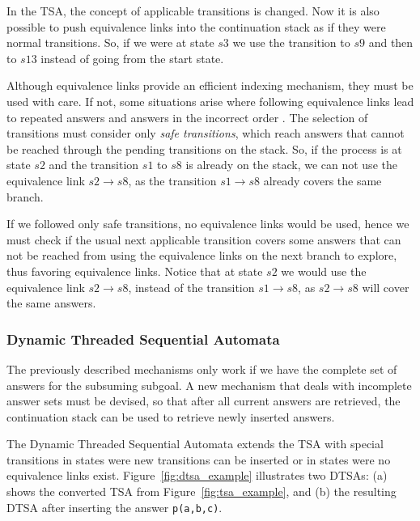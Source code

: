 In the TSA, the concept of applicable transitions is changed. Now it is also possible to push equivalence links
into the continuation stack as if they were normal transitions. So, if we were at state $s3$ we use
the transition to $s9$ and then to $s13$ instead of going from the start state.

Although equivalence links provide an efficient indexing mechanism, they must be used with care. If not,
some situations arise where following equivalence links lead to repeated answers and answers in the
incorrect order \cite{Rao-96}. The selection of transitions must consider only \textit{safe transitions},
which reach answers that cannot be reached through the pending transitions on the stack.
So, if the process is at state $s2$ and the transition $s1$ to $s8$ is already on the
stack, we can not use the equivalence link $s2 \rightarrow s8$, as the transition $s1 \rightarrow s8$
already covers the same branch.

If we followed only safe transitions, no equivalence links would be used, hence we must check if
the usual next applicable transition covers some answers that can not be reached from using the
equivalence links on the next branch to explore, thus favoring equivalence links. Notice that at
state $s2$ we would use the equivalence link $s2 \rightarrow s8$, instead of the transition
$s1 \rightarrow s8$, as $s2 \rightarrow s8$ will cover the same answers.
 
\subsubsection{Dynamic Threaded Sequential Automata}

The previously described mechanisms only work if we have the complete set of answers for the subsuming subgoal.
A new mechanism that deals with incomplete answer sets must be devised, so that after all current answers
are retrieved, the continuation stack can be used to retrieve newly inserted answers.

The Dynamic Threaded Sequential Automata extends the TSA with special transitions in states
were new transitions can be inserted or in states were no equivalence links exist.
Figure~\ref{fig:dtsa_example} illustrates two DTSAs: (a) shows the converted TSA from Figure~\ref{fig:tsa_example}, and
(b) the resulting DTSA after inserting the answer \texttt{p(a,b,c)}.

